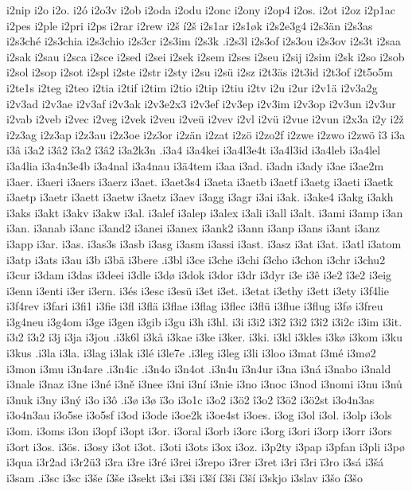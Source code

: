 {{i2nip
i2o
i2o.
i2ó
i2o3v
i2ob
i2oda
i2odu
i2onc
i2ony
i2op4
i2os.
i2ot
i2oz
i2p1ac
i2pes
i2ple
i2pri
i2ps
i2rar
i2rew
i2š
í2š
i2s1ar
i2s1øk
i2s2e3g4
i2s3än
i2s3as
i2s3ché
i2s3chia
i2s3chio
i2s3cr
i2s3im
í2s3k
.i2s3l
i2s3of
i2s3ou
i2s3ov
i2s3t
i2saa
i2sak
i2sau
i2sca
i2sce
i2sed
i2sei
i2sek
i2sem
i2ses
i2seu
i2sij
i2sim
i2sk
i2so
i2sob
i2sol
i2sop
i2sot
i2spl
i2ste
i2str
i2sty
i2su
i2sü
i2sz
i2t3äs
i2t3id
i2t3of
i2t5o5m
i2te1s
i2teg
i2teo
i2tia
i2tif
i2tim
i2tio
i2tip
i2tiu
i2tv
i2u
i2ur
i2v1ä
i2v3a2g
i2v3ad
i2v3ae
i2v3af
i2v3ak
i2v3e2x3
i2v3ef
i2v3ep
i2v3im
i2v3op
i2v3un
i2v3ur
i2vab
i2veb
i2vec
i2veg
i2vek
i2veu
i2veü
i2vev
i2vl
i2vü
i2vue
i2vun
i2x3a
i2y
i2ž
i2z3ag
i2z3ap
i2z3au
i2z3oe
i2z3or
i2zän
i2zat
i2zö
i2zo2f
i2zwe
i2zwo
i2zwö
î3
i3a
i3â
i3a2
i3â2
î3a2
î3â2
i3a2k3n
.i3a4
i3a4kei
i3a4l3e4t
i3a4l3id
i3a4leb
i3a4lel
i3a4lia
i3a4n3e4b
i3a4nal
i3a4nau
i3ä4tem
i3aa
i3ad.
i3adn
i3ady
i3ae
i3ae2m
i3aer.
i3aeri
i3aers
i3aerz
i3aet.
i3aet3s4
i3aeta
i3aetb
i3aetf
i3aetg
i3aeti
i3aetk
i3aetp
i3aetr
i3aett
i3aetw
i3aetz
i3aev
i3agg
i3agr
i3ai
i3ak.
i3ake4
i3akg
i3akh
i3aks
i3akt
i3akv
i3akw
i3al.
i3alef
i3alep
i3alex
i3ali
i3all
i3alt.
i3ami
i3amp
i3an
i3an.
i3anab
i3anc
i3and2
i3anei
i3anex
i3ank2
i3ann
i3anp
i3ans
i3ant
i3anz
i3app
i3ar.
i3as.
i3as3s
i3asb
i3asg
i3asm
i3assi
i3ast.
i3asz
i3at
i3at.
i3atl
i3atom
i3atp
i3ats
i3au
i3b
i3bä
i3bere
.i3bl
i3ce
i3che
i3chi
í3cho
i3chon
i3chr
i3chu2
i3cur
i3dam
i3das
i3deei
i3dle
i3dø
i3dok
i3dor
i3dr
i3dyr
i3e
i3ê
i3e2
î3e2
i3eig
i3enn
i3enti
i3er
i3ern.
i3és
i3esc
i3esü
i3et
i3et.
i3etat
i3ethy
i3ett
i3ety
i3f4lie
i3f4rev
i3fari
i3fi1
i3fie
i3fl
i3flä
i3flae
i3flag
i3flec
i3flü
i3flue
i3flug
i3fø
i3freu
i3g4neu
i3g4om
i3ge
i3gen
i3gib
i3gu
i3h
i3hl.
i3i
i3i2
i3î2
î3i2
î3î2
i3i2c
i3im
i3it.
i3ı2
î3ı2
i3j
i3ja
i3jou
.i3k6l
i3kå
i3kae
i3ke
i3ker.
i3ki.
i3kl
i3kles
i3kø
i3kom
i3ku
i3kus
.i3la
i3la.
i3lag
i3lak
i3lé
i3le7e
.i3leg
i3leg
i3li
i3loo
i3mat
í3mé
i3mø2
i3mon
i3mu
i3n4are
.i3n4ic
.i3n4o
i3n4ot
.i3n4u
ï3n4ur
i3na
i3ná
i3nabo
i3nald
i3nale
i3naz
i3ne
i3né
i3ně
i3nee
i3ni
i3ní
i3nie
i3no
i3noc
i3nod
i3nomi
i3nu
i3nů
i3nuk
i3ny
i3ný
i3o
i3ô
.i3ø
i3ø
ï3o
i3o1c
i3o2
i3ö2
î3o2
î3ö2
i3ö2st
i3o4n3as
i3o4n3au
i3o5se
i3o5sf
i3od
i3ode
i3oe2k
i3oe4st
i3oes.
i3og
i3ol
i3ol.
i3olp
i3ols
i3om.
i3oms
i3on
i3opf
i3opt
i3or.
i3oral
i3orb
i3orc
i3org
i3ori
i3orp
i3orr
i3ors
i3ort
i3os.
i3ös.
i3osy
i3ot
i3ot.
i3oti
i3ots
i3ox
i3oz.
i3p2ty
i3pap
i3pfan
i3pli
i3pø
i3qua
i3r2ad
i3r2ü3
i3ra
i3re
i3ré
i3rei
i3repo
i3rer
i3ret
i3ri
ï3ri
ï3ro
i3sá
i3šá
i3sam
.i3sc
i3sc
i3še
í3še
i3sekt
i3si
i3ši
i3ší
í3ši
í3ší
i3skjo
i3slav
i3šo
í3šo
}}
